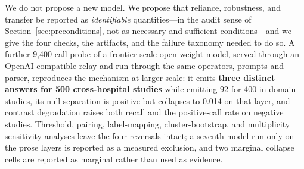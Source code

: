 We do not propose a new model. We propose that reliance, robustness, and transfer be reported as \emph{identifiable} quantities---in the audit sense of Section~\ref{sec:preconditions}, not as necessary-and-sufficient conditions---and we give the four checks, the artifacts, and the failure taxonomy needed to do so. A further 9,400-call probe of a frontier-scale open-weight model, served through an OpenAI-compatible relay and run through the same operators, prompts and parser, reproduces the mechanism at larger scale: it emits \textbf{three distinct answers for 500 cross-hospital studies} while emitting 92 for 400 in-domain studies, its null separation is positive but collapses to 0.014 on that layer, and contrast degradation raises both recall and the positive-call rate on negative studies. Threshold, pairing, label-mapping, cluster-bootstrap, and multiplicity sensitivity analyses leave the four reversals intact; a seventh model run only on the prose layers is reported as a measured exclusion, and two marginal collapse cells are reported as marginal rather than used as evidence.
